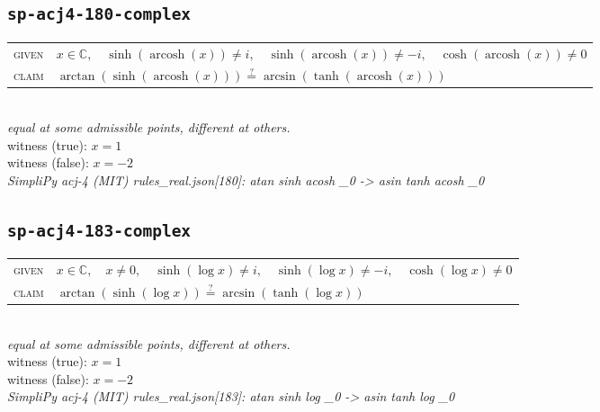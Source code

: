 \documentclass[11pt]{article}
\begin{document}
\subsection*{\texttt{sp-acj4-180-complex}}
\begin{tabular}{@{}l@{\quad}l@{}}
\textsc{given} & $x \in \mathbb{C},\quad \sinh\left(\operatorname{arcosh}\left(x\right)\right) \neq i,\quad \sinh\left(\operatorname{arcosh}\left(x\right)\right) \neq -i,\quad \cosh\left(\operatorname{arcosh}\left(x\right)\right) \neq 0$ \\[4pt]
\textsc{claim} & $\displaystyle \arctan\left(\sinh\left(\operatorname{arcosh}\left(x\right)\right)\right) \overset{?}{=} \arcsin\left(\tanh\left(\operatorname{arcosh}\left(x\right)\right)\right)$ \\
\end{tabular}\\[2pt]
{\small\emph{equal at some admissible points, different at others.}}\\
{\footnotesize\color{gray}witness (true): $x = 1$}\\
{\footnotesize\color{gray}witness (false): $x = -2$}\\
\emph{SimpliPy acj-4 (MIT) rules\_real.json[180]: atan sinh acosh \_0  ->  asin tanh acosh \_0}\\

\subsection*{\texttt{sp-acj4-183-complex}}
\begin{tabular}{@{}l@{\quad}l@{}}
\textsc{given} & $x \in \mathbb{C},\quad x \neq 0,\quad \sinh\left(\log x\right) \neq i,\quad \sinh\left(\log x\right) \neq -i,\quad \cosh\left(\log x\right) \neq 0$ \\[4pt]
\textsc{claim} & $\displaystyle \arctan\left(\sinh\left(\log x\right)\right) \overset{?}{=} \arcsin\left(\tanh\left(\log x\right)\right)$ \\
\end{tabular}\\[2pt]
{\small\emph{equal at some admissible points, different at others.}}\\
{\footnotesize\color{gray}witness (true): $x = 1$}\\
{\footnotesize\color{gray}witness (false): $x = -2$}\\
\emph{SimpliPy acj-4 (MIT) rules\_real.json[183]: atan sinh log \_0  ->  asin tanh log \_0}\\
\end{document}
